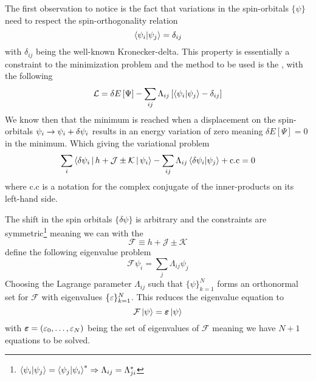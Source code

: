         The first observation to notice is the fact that variations in the
        spin-orbitals $\{\psi\}$ need to respect the spin-orthogonality
        relation
            \begin{equation}
                \braket{\psi_i}{\psi_j} = \delta_{ij}
            \end{equation}
        with $\delta_{ij}$ being the well-known Kronecker-delta. This property
        is essentially a constraint to the minimization problem and the method
        to be used is the \cite{linalgDavid},
        with the following 
            \begin{equation}
                \mathcal{L} = \delta E\left[\Psi\right] -
                \sum_{ij}\Lambda_{ij}\left[\braket{\psi_i}{\psi_j} -
                \delta_{ij}\right]
            \end{equation}
        We know then that the minimum is reached when a displacement on the
        spin-orbitals $\psi_i\rightarrow\psi_i+\delta \psi_i$ results in an energy
        variation of zero meaning $\delta E\left[\Psi\right]=0$ in the minimum.
        Which giving the variational problem 
            \begin{equation}
                \sum_i \Braket{\delta\psi_i | h + \mathcal{J} \pm \mathcal{K} |
                \psi_i} - \sum_{ij} \Lambda_{ij}\braket{\delta\psi_i}{\psi_j} +
                \text{c.c} = 0
            \end{equation}
        where $\text{c.c}$ is a notation for the complex conjugate of the
        inner-products on its left-hand side.

        The shift in the spin orbitals $\{\delta \psi\}$ is arbitrary and the
        constraints are
        symmetric\footnote{$\braket{\psi_i}{\psi_j}=\braket{\psi_j}{\psi_i}^{*}
        \Rightarrow \Lambda_{ij}=\Lambda^{*}_{ji}$} meaning we can with the
            \begin{equation}
                \mathcal{F} \equiv h + \mathcal{J} \pm \mathcal{K}
            \end{equation}
        define the following eigenvalue problem
            \begin{equation}
                \mathcal{F}\psi_i = \sum_j\Lambda_{ij}\psi_j
            \end{equation}
        Choosing the Lagrange parameter $\Lambda_{ij}$ such that
        $\{\psi\}^N_{k=1}$ forms an orthonormal set for $\mathcal{F}$ with
        eigenvalues $\{\varepsilon\}^N_{k=1}$. This reduces the eigenvalue equation
        to
            \begin{equation}
                \mathcal{F}\ket{\psi} = \boldsymbol{{\varepsilon}}\ket{\psi}
                \label{eq:HFequations}
            \end{equation}
        with $\boldsymbol{{\varepsilon}}=(\varepsilon_0,\dots,\varepsilon_N)$ being the set of
        eigenvalues of $\mathcal{F}$ meaning we have $N+1$ equations to be
        solved.

